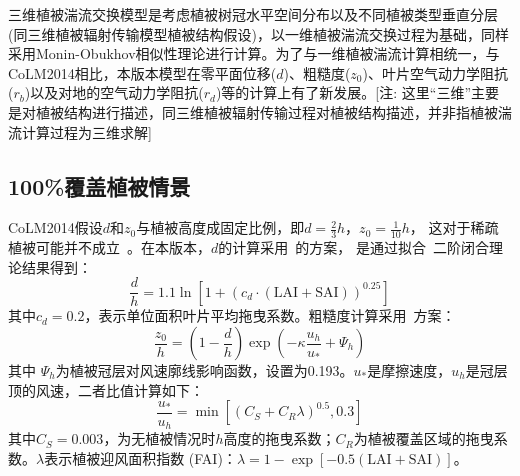 三维植被湍流交换模型是考虑植被树冠水平空间分布以及不同植被类型垂直分层(同三维植被辐射传输模型植被结构假设)，以一维植被湍流交换过程为基础，同样采用Monin-Obukhov相似性理论进行计算。为了与一维植被湍流计算相统一，与CoLM2014相比，本版本模型在零平面位移($d$)、粗糙度($z_0$)、叶片空气动力学阻抗($r_b$)以及对地的空气动力学阻抗($r_d$)等的计算上有了新发展。[注: 这里“三维”主要是对植被结构进行描述，同三维植被辐射传输过程对植被结构描述，并非指植被湍流计算过程为三维求解]


\subsection{100\%覆盖植被情景}\label{百分百植被覆盖湍流}
CoLM2014假设$d$和$z_0$与植被高度成固定比例，即$d=\frac{2}{3}h$，$z_0=\frac{1}{10}h$，
这对于稀疏植被可能并不成立~\citep{zeng2007consistent}。在本版本，$d$的计算采用~\citet{choudhury1988}的方案，
是通过拟合~\citet{shaw1982aerodynamic}二阶闭合理论结果得到：
\begin{equation}\label{dOh}
\frac{d}{h}=1.1 \ln \left[1+\left(c_{d} \cdot (\text {LAI} + \text {SAI})\right)^{0.25}\right]
\end{equation}
其中$c_d=0.2$，表示单位面积叶片平均拖曳系数。粗糙度计算采用~\citet{raupach1992drag,raupach1994simplified}方案：
\begin{equation}\label{zOh}
\frac{z_{0}}{h}=\left(1-\frac{d}{h}\right) \exp \left(-\kappa \frac{u_{h}}{u_{*}}+\Psi_{h}\right)
\end{equation}
其中%
$\Psi_h$为植被冠层对风速廓线影响函数，设置为0.193。$u_\ast$是摩擦速度，$u_h$是冠层顶的风速，二者比值计算如下：
\begin{equation}\label{ustrarOuh}
\frac{u_{*}}{u_{h}}=\min \left[\left(C_{S}+C_{R} \lambda\right)^{0.5}, 0.3\right]
\end{equation}
其中$C_S=0.003$，为无植被情况时$h$高度的拖曳系数；$C_R$为植被覆盖区域的拖曳系数。$\lambda$表示植被迎风面积指数 (FAI)：$\lambda=1-\exp{\left[-0.5 (\text {LAI}+\text {SAI})\right]}$。


